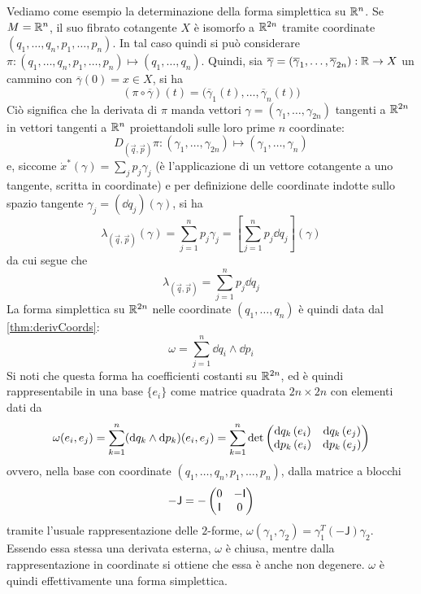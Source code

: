Vediamo come esempio la determinazione della forma simplettica su $\mathbb{R}^{n}$. Se $M = \mathbb{R}^{n}$, il suo fibrato cotangente $X$ è isomorfo a $\mathbb{R}^{2n}$ tramite coordinate $(q_1, \ldots, q_n, p_1, \ldots, p_n)$. In tal caso quindi si può considerare $\pi: (q_1, \ldots, q_n, p_1, \ldots, p_n) \mapsto  (q_1, \ldots, q_n)$. Quindi, sia $\overline{\gamma} = (\overline{\gamma}_1, \ldots, \overline{\gamma}_{2n}):\mathbb{R} \to X$ un cammino con $\overline{\gamma}(0) = x \in X$, si ha \begin{equation*}
(\pi \circ \overline{\gamma}) (t) = \big(\overline{\gamma}_1(t), \ldots, \overline{\gamma}_n (t)\big)
\end{equation*} 
Ciò significa che la derivata di $\pi$ manda vettori $\gamma = (\gamma_1, \ldots, \gamma_{2n})$ tangenti a $\mathbb{R}^{2n}$ in vettori tangenti a $\mathbb{R}^{n}$ proiettandoli sulle loro prime $n$ coordinate:
\begin{equation*}
  D_{(\vec{q},\vec{p})}\pi: (\gamma_1, \ldots, \gamma_{2n}) \mapsto  (\gamma_1, \ldots, \gamma_n)
\end{equation*}
e, siccome $\dot{x}^*(\gamma) = \sum_j p_j \gamma_j$ (è l'applicazione di un vettore cotangente a uno tangente, scritta in coordinate) e per definizione delle coordinate indotte sullo spazio tangente $\gamma_j = (\dd{q}_j)(\gamma)$, si ha \begin{equation*}
\lambda_{(\vec{q},\vec{p})} (\gamma) = \sum_{j=1}^n p_j \gamma_j = \left[\sum_{j=1}^n p_j \dd{q_j}\right] (\gamma)
\end{equation*} 
da cui segue che \begin{equation}
  \lambda_{(\vec{q},\vec{p})} = \sum_{j=1}^n p_j \dd{q_j}
\end{equation} 
La forma simplettica su $\mathbb{R}^{2n}$ nelle coordinate $(q_1, \ldots, q_n)$ è quindi data dal \autoref{thm:derivCoords}: 
\begin{equation} \label{eq:R2nSympForm}
\omega = \sum_{j=1}^n \dd{q_i} \wedge \dd{p_i}
\end{equation} 
Si noti che questa forma ha coefficienti costanti su $\mathbb{R}^{2n}$, ed è quindi rappresentabile in una base $\{e_i\}$ come matrice quadrata $2n \times 2n$ con elementi dati da 
\begin{equation*}
\omega(e_i, e_j) = \sum_{k=1}^{n} (\dd{q_k} \wedge \dd{p_k})(e_i, e_j) = \sum_{k=1}^{n} \det\pmqty{\dd{q_k}(e_i) & \dd{q_k}(e_j) \\\dd{p_k}(e_i) & \dd{p_k}(e_j)}
\end{equation*}
ovvero, nella base con coordinate $(q_1, \ldots, q_n, p_1, \ldots, p_n)$, dalla matrice a blocchi
\begin{equation*}
- \mathsf{J} = - \pmqty{0 & -\mathsf{I} \\ \mathsf{I} & 0}
\end{equation*} 
tramite l'usuale rappresentazione delle $2$-forme, $\omega(\gamma_1, \gamma_2) = \gamma_1^T (-\mathsf{J}) \gamma_2$. Essendo essa stessa una derivata esterna, $\omega$ è chiusa, mentre dalla rappresentazione in coordinate si ottiene che essa è anche non degenere. $\omega$ è quindi effettivamente una forma simplettica.

